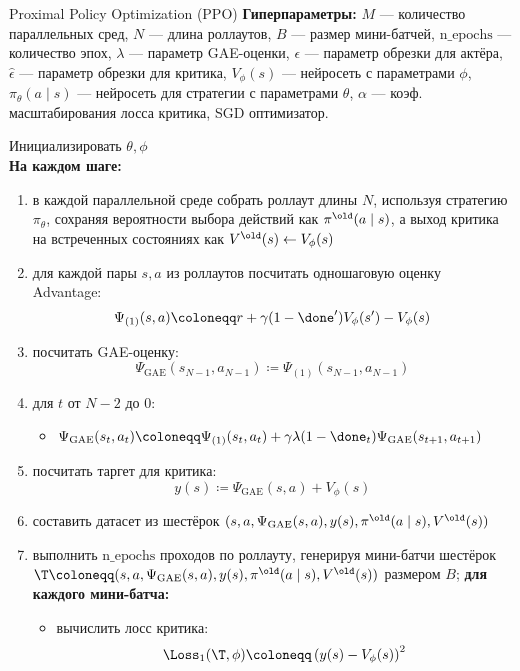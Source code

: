 \begin{algorithm}[label = PPOalgorithm]{Proximal Policy Optimization (PPO)}
\textbf{Гиперпараметры:} $M$ --- количество параллельных сред, $N$ --- длина роллаутов, $B$ --- размер мини-батчей, $\mathrm{n\_epochs}$ --- количество эпох, $\lambda$ --- параметр GAE-оценки, $\epsilon$ --- параметр обрезки для актёра, $\hat{\epsilon}$ --- параметр обрезки для критика, $V_\phi(s)$ --- нейросеть с параметрами $\phi$, $\pi_{\theta}(a \mid s)$ --- нейросеть для стратегии с параметрами $\theta$, $\alpha$ --- коэф. масштабирования лосса критика, SGD оптимизатор.

\vspace{0.3cm}
Инициализировать $\theta, \phi$ \\
\textbf{На каждом шаге:}
\begin{enumerate}
    \item в каждой параллельной среде собрать роллаут длины $N$, используя стратегию $\pi_{\theta}$, сохраняя вероятности выбора действий как $\pi^{\old}(a \mid s)$, а выход критика на встреченных состояниях как $V^{\old}(s) \leftarrow V_{\phi}(s)$
    \item для каждой пары $s, a$ из роллаутов посчитать одношаговую оценку Advantage:
    $$\Psi_{(1)}(s, a) \coloneqq r + \gamma (1 - \done') V_{\phi}(s') - V_{\phi}(s)$$
    \item посчитать GAE-оценку:
    $$\Psi_{\mathrm{GAE}}(s_{N-1}, a_{N-1}) \coloneqq \Psi_{(1)}(s_{N-1}, a_{N-1})$$
    \item для $t$ от $N - 2$ до 0:
    \begin{itemize}
    \item $\Psi_{\mathrm{GAE}}(s_t, a_t) \coloneqq \Psi_{(1)}(s_t, a_t) + \gamma \lambda (1 - \done_t) \Psi_{\mathrm{GAE}}(s_{t+1}, a_{t+1})$
    \end{itemize}
    \item посчитать таргет для критика:
    $$y(s) \coloneqq \Psi_{\mathrm{GAE}}(s, a) + V_{\phi}(s)$$
    \item составить датасет из шестёрок $(s, a, \Psi_{\mathrm{GAE}}(s, a), y(s), \pi^{\old}(a \mid s), V^{\old}(s))$
    \item выполнить $\mathrm{n\_epochs}$ проходов по роллауту, генерируя мини-батчи шестёрок $\T \coloneqq (s, a, \Psi_{\mathrm{GAE}}(s, a), y(s), \pi^{\old}(a \mid s), V^{\old}(s))$ размером $B$; \textbf{для каждого мини-батча:}
    \begin{itemize}
    \item вычислить лосс критика:
    $$\Loss_1(\T, \phi) \coloneqq \left( y(s) - V_\phi(s) \right) ^2$$

\end{itemize}
\end{enumerate}
\end{algorithm}
